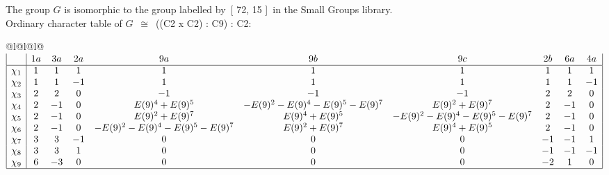 \documentclass[varwidth=\maxdimen,border=10]{standalone}
\begin{document}
The group $G$ is isomorphic to the group labelled by\ [ 72, 15 ]\ in the Small Groups library.\\
Ordinary character table of $G$\ $\cong$\ ((C2 x C2) : C9) : C2:\\
\begin{center}
\begin{tabular}{@{}l@{}l@{}l@{}}
\hline
\(\begin{array}{|l|ccccccccc|}
  & 1a & 3a & 2a & 9a & 9b & 9c & 2b & 6a & 4a\\ \hline
\chi_{1} & 1 & 1 & 1 & 1 & 1 & 1 & 1 & 1 & 1\\
\chi_{2} & 1 & 1 & -1 & 1 & 1 & 1 & 1 & 1 & -1\\
\chi_{3} & 2 & 2 & 0 & -1 & -1 & -1 & 2 & 2 & 0\\
\chi_{4} & 2 & -1 & 0 & E(9)^{4}+E(9)^{5} & -E(9)^{2}-E(9)^{4}-E(9)^{5}-E(9)^{7} & E(9)^{2}+E(9)^{7} & 2 & -1 & 0\\
\chi_{5} & 2 & -1 & 0 & E(9)^{2}+E(9)^{7} & E(9)^{4}+E(9)^{5} & -E(9)^{2}-E(9)^{4}-E(9)^{5}-E(9)^{7} & 2 & -1 & 0\\
\chi_{6} & 2 & -1 & 0 & -E(9)^{2}-E(9)^{4}-E(9)^{5}-E(9)^{7} & E(9)^{2}+E(9)^{7} & E(9)^{4}+E(9)^{5} & 2 & -1 & 0\\
\chi_{7} & 3 & 3 & -1 & 0 & 0 & 0 & -1 & -1 & 1\\
\chi_{8} & 3 & 3 & 1 & 0 & 0 & 0 & -1 & -1 & -1\\
\chi_{9} & 6 & -3 & 0 & 0 & 0 & 0 & -2 & 1 & 0\\
\hline
\end{array}\)\\
\end{tabular}
\end{center}
\end{document}
